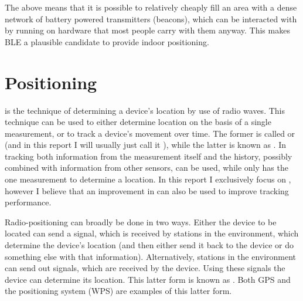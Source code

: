 The above means that it is possible to relatively cheaply fill an area with a dense network of battery powered \BLE transmitters (beacons), which can be interacted with by \apps running on hardware that most people carry with them anyway.
This makes BLE a plausible candidate to provide indoor positioning.

\section{Positioning}
 is the technique of determining a device's location by use of radio waves.
This technique can be used to either determine location on the basis of a single measurement, or to track a device's movement over time.
The former is called  or  (and in this report I will usually just call it ), while the latter is known as .
In tracking both information from the measurement itself and the history, possibly combined with information from other sensors, can be used, while \ptfp only has the one measurement to determine a location.
In this report I exclusively focus on \ptfp, however I believe that an improvement in \ptfp can also be used to improve tracking performance.

Radio-positioning can broadly be done in two ways.
Either the device to be located can send a signal, which is received by stations in the environment, which determine the device's location (and then either send it back to the device or do something else with that information).
Alternatively, stations in the environment can send out signals, which are received by the device.
Using these signals the device can determine its location.
This latter form is known as .
Both GPS and the \wifi positioning system (WPS) are examples of this latter form.

